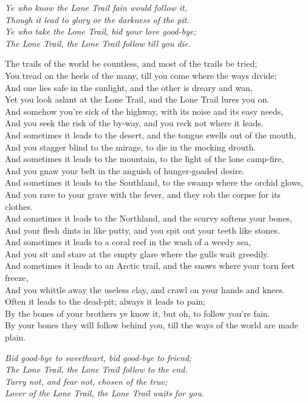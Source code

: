 
\begin{poemblock}
\textit{
Ye who know the Lone Trail fain would follow it,\\
\idt Though it lead to glory or the darkness of the pit.\\
Ye who take the Lone Trail, bid your love good-bye;\\
\idt The Lone Trail, the Lone Trail follow till you die.
}

The trails of the world be countless, and most of the trails be tried;\\
\idt You tread on the heels of the many, till you come where the ways divide;\\
And one lies safe in the sunlight, and the other is dreary and wan,\\
\idt Yet you look aslant at the Lone Trail, and the Lone Trail lures you on.\\
And somehow you're sick of the highway, with its noise and its easy needs,\\
\idt And you seek the risk of the by-way, and you reck not where it leads.\\
And sometimes it leads to the desert, and the tongue swells out of the mouth,\\
\idt And you stagger blind to the mirage, to die in the mocking drouth.\\
And sometimes it leads to the mountain, to the light of the lone camp-fire,\\
\idt And you gnaw your belt in the anguish of hunger-goaded desire.\\
And sometimes it leads to the Southland, to the swamp where the orchid glows,\\
\idt And you rave to your grave with the fever, and they rob the corpse for its clothes.\\
And sometimes it leads to the Northland, and the scurvy softens your bones,\\
\idt And your flesh dints in like putty, and you spit out your teeth like stones.\\
And sometimes it leads to a coral reef in the wash of a weedy sea,\\
\idt And you sit and stare at the empty glare where the gulls wait greedily.\\
And sometimes it leads to an Arctic trail, and the snows where your torn feet freeze,\\
\idt And you whittle away the useless clay, and crawl on your hands and knees.\\
Often it leads to the dead-pit; always it leads to pain;\\
\idt By the bones of your brothers ye know it, but oh, to follow you're fain.\\
By your bones they will follow behind you, till the ways of the world are made plain.

\textit{
Bid good-bye to sweetheart, bid good-bye to friend;\\
\idt The Lone Trail, the Lone Trail follow to the end.\\
Tarry not, and fear not, chosen of the true;\\
\idt Lover of the Lone Trail, the Lone Trail waits for you.
}
\end{poemblock}
